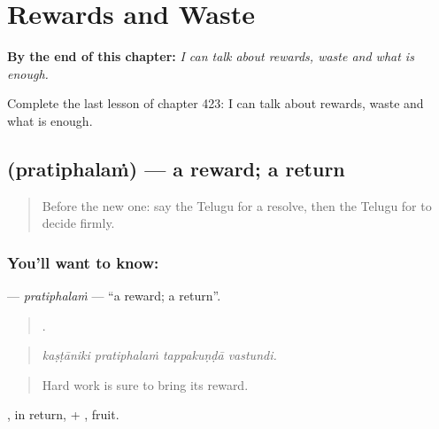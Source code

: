 
\chapter{Rewards and Waste}
\label{ch:te-rewards-and-waste}

\begin{chapteropening}
\textbf{By the end of this chapter:} \emph{I can talk about rewards, waste and what is enough.}

Complete the last lesson of chapter 423: I can talk about rewards, waste and what is enough.
\end{chapteropening}

\section[\texorpdfstring{\te{ప్రతిఫలం} (pratiphalaṁ)}{ప్రతిఫలం (pratiphalaṁ)}]{ (pratiphalaṁ) — a reward; a return}

\label{lesson:TE-C423-pratiphalam}



\begin{quote}
Before the new one: say the Telugu for a resolve, then the Telugu for to decide firmly.
\end{quote}

\subsection*{You'll want to know: }
\textbf{} — \emph{pratiphalaṁ} — \textquotedblleft{}a reward; a return\textquotedblright{}.

\begin{quote}
   .
\end{quote}

\begin{quote}
\emph{kaṣṭāniki pratiphalaṁ tappakuṇḍā vastundi.}
\end{quote}

\begin{quote}
Hard work is sure to bring its reward.
\end{quote}

, in return, + , fruit.

